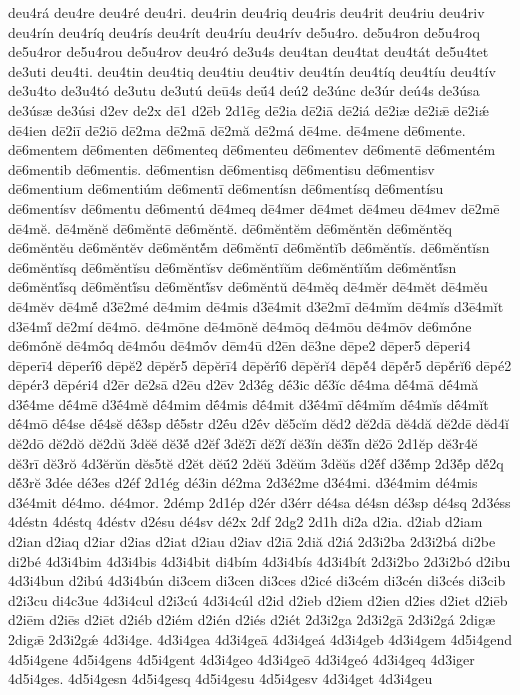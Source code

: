 {deu4rá
deu4re
deu4ré
deu4ri.
deu4rin
deu4riq
deu4ris
deu4rit
deu4riu
deu4riv
deu4rín
deu4ríq
deu4rís
deu4rít
deu4ríu
deu4rív
de5u4ro.
de5u4ron
de5u4roq
de5u4ror
de5u4rou
de5u4rov
deu4ró
de3u4s
deu4tan
deu4tat
deu4tát
de5u4tet
de3uti
deu4ti.
deu4tin
deu4tiq
deu4tiu
deu4tiv
deu4tín
deu4tíq
deu4tíu
deu4tív
de3u4to
de3u4tó
de3utu
de3utú
deū4s
deū́4
deú2
de3únc
de3úr
deú4s
de3úsa
de3úsæ
de3úsi
d2ev
de2x
dē1
d2ēb
2d1ēg
dē2ia
dē2iā
dē2iá
dē2iæ
dē2iǣ
dē2iǽ
dē4ien
dē2iī
dē2iō
dē2ma
dē2mā
dē2mă
dē2má
dē4me.
dē4mene
dē6mente.
dē6mentem
dē6menten
dē6menteq
dē6menteu
dē6mentev
dē6mentē
dē6mentém
dē6mentib
dē6mentis.
dē6mentisn
dē6mentisq
dē6mentisu
dē6mentisv
dē6mentium
dē6mentiúm
dē6mentī
dē6mentísn
dē6mentísq
dē6mentísu
dē6mentísv
dē6mentu
dē6mentú
dē4meq
dē4mer
dē4met
dē4meu
dē4mev
dē2mē
dē4mĕ.
dē4mĕnĕ
dē6mĕntē
dē6mĕntĕ.
dē6mĕntĕm
dē6mĕntĕn
dē6mĕntĕq
dē6mĕntĕu
dē6mĕntĕv
dē6mĕntĕ́m
dē6mĕntī
dē6mĕntĭb
dē6mĕntĭs.
dē6mĕntĭsn
dē6mĕntĭsq
dē6mĕntĭsu
dē6mĕntĭsv
dē6mĕntĭŭm
dē6mĕntĭŭ́m
dē6mĕntĭ́sn
dē6mĕntĭ́sq
dē6mĕntĭ́su
dē6mĕntĭ́sv
dē6mĕntŭ
dē4mĕq
dē4mĕr
dē4mĕt
dē4mĕu
dē4mĕv
dē4mĕ́
d3ē2mé
dē4mim
dē4mis
d3ē4mit
d3ē2mī
dē4mĭm
dē4mĭs
d3ē4mĭt
d3ē4mĭ́
dē2mí
dē4mō.
dē4mōne
dē4mōnĕ
dē4mōq
dē4mōu
dē4mōv
dē6mṓne
dē6mṓnĕ
dē4mṓq
dē4mṓu
dē4mṓv
dēm4ū
d2ēn
dē3ne
dēpe2
dēper5
dēperi4
dēperī4
dēperī́6
dēpĕ2
dēpĕr5
dēpĕrī4
dēpĕrī́6
dēpĕrĭ4
dēpĕ́4
dēpĕ́r5
dēpĕ́rĭ6
dēpé2
dēpér3
dēpéri4
d2ēr
dē2sā
d2ēu
d2ēv
2d3ḗg
dḗ3ic
dḗ3ĭc
dḗ4ma
dḗ4mā
dḗ4mă
d3ḗ4me
dḗ4mē
d3ḗ4mĕ
dḗ4mim
dḗ4mis
dḗ4mit
d3ḗ4mī
dḗ4mĭm
dḗ4mĭs
dḗ4mĭt
dḗ4mō
dḗ4se
dḗ4sĕ
dḗ3sp
dḗ5str
d2ḗu
d2ḗv
dĕ5cĭm
dĕd2
dĕ2dā
dĕ4dă
dĕ2dē
dĕd4ĭ
dĕ2dō
dĕ2dŏ
dĕ2dŭ
3dĕĕ
dĕ3ĕ́
d2ĕf
3dĕ2ī
dĕ2ĭ
dĕ3ĭn
dĕ3ĭ́n
dĕ2ō
2d1ĕp
dĕ3r4ĕ
dĕ3rī
dĕ3rŏ
4d3ĕrŭn
dĕs5tĕ
d2ĕt
dĕū́2
2dĕŭ
3dĕŭm
3dĕŭs
d2ĕ́f
d3ĕ́mp
2d3ĕ́p
dĕ́2q
dĕ́3rĕ
3dée
dé3es
d2éf
2d1ég
dé3in
dé2ma
2d3é2me
d3é4mi.
d3é4mim
dé4mis
d3é4mit
dé4mo.
dé4mor.
2démp
2d1ép
d2ér
d3érr
dé4sa
dé4sn
dé3sp
dé4sq
2d3éss
4déstn
4déstq
4déstv
d2ésu
dé4sv
dé2x
2df
2dg2
2d1h
di2a
d2ia.
d2iab
d2iam
d2ian
d2iaq
d2iar
d2ias
d2iat
d2iau
d2iav
d2iā
2diă
d2iá
2d3i2ba
2d3i2bá
di2be
di2bé
4d3i4bim
4d3i4bis
4d3i4bit
di4bím
4d3i4bís
4d3i4bít
2d3i2bo
2d3i2bó
d2ibu
4d3i4bun
d2ibú
4d3i4bún
di3cem
di3cen
di3ces
d2icé
di3cém
di3cén
di3cés
di3cib
d2i3cu
di4c3ue
4d3i4cul
d2i3cú
4d3i4cúl
d2id
d2ieb
d2iem
d2ien
d2ies
d2iet
d2iēb
d2iēm
d2iēs
d2iēt
d2iéb
d2iém
d2ién
d2iés
d2iét
2d3i2ga
2d3i2gā
2d3i2gá
2digæ
2digǣ
2d3i2gǽ
4d3i4ge.
4d3i4gea
4d3i4geā
4d3i4geá
4d3i4geb
4d3i4gem
4d5i4gend
4d5i4gene
4d5i4gens
4d5i4gent
4d3i4geo
4d3i4geō
4d3i4geó
4d3i4geq
4d3iger
4d5i4ges.
4d5i4gesn
4d5i4gesq
4d5i4gesu
4d5i4gesv
4d3i4get
4d3i4geu
}
